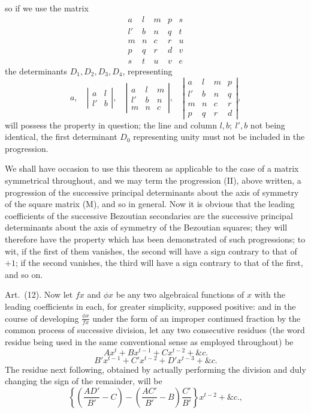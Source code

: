 \documentclass[11pt]{article}
\newcommand{\sourcepage}[1]{\marginpar{\scriptsize p.~#1}}
\newcommand{\art}[1]{\par\smallskip\noindent Art.~(#1).\quad}
\begin{document}
\sourcepage{455}
so if we use the matrix
\[
\begin{array}{ccccc}
a&l&m&p&s\\
l'&b&n&q&t\\
m&n&c&r&u\\
p&q&r&d&v\\
s&t&u&v&e
\end{array}
\]
the determinants $D_1,D_2,D_3,D_4$, representing
\[
a,\quad
\left|\begin{array}{cc}a&l\\ l'&b\end{array}\right|,\quad
\left|\begin{array}{ccc}a&l&m\\ l'&b&n\\ m&n&c\end{array}\right|,\quad
\left|\begin{array}{cccc}a&l&m&p\\ l'&b&n&q\\ m&n&c&r\\ p&q&r&d\end{array}\right|,
\]
will possess the property in question; the line and column $l,b;\ l',b$ not being identical, the first determinant $D_0$ representing unity must not be included in the progression.

We shall have occasion to use this theorem as applicable to the case of a matrix symmetrical throughout, and we may term the progression (II), above written, a progression of the successive principal determinants about the axis of symmetry of the square matrix (M), and so in general. Now it is obvious that the leading coefficients of the successive Bezoutian secondaries are the successive principal determinants about the axis of symmetry of the Bezoutian squares; they will therefore have the property which has been demonstrated of such progressions; to wit, if the first of them vanishes, the second will have a sign contrary to that of $+1$; if the second vanishes, the third will have a sign contrary to that of the first, and so on.

\art{12} Now let $fx$ and $\phi x$ be any two algebraical functions of $x$ with the leading coefficients in each, for greater simplicity, supposed positive: and in the course of developing $\frac{\phi x}{fx}$ under the form of an improper continued fraction by the common process of successive division, let any two consecutive residues (the word residue being used in the same conventional sense as employed throughout) be
\[
Ax^t+Bx^{t-1}+Cx^{t-2}+\&c.
\]
\[
B'x^{t-1}+C'x^{t-2}+D'x^{t-3}+\&c.
\]
The residue next following, obtained by actually performing the division and duly changing the sign of the remainder, will be
\[
\left\{\left(\frac{AD'}{B'}-C\right)-\left(\frac{AC'}{B'}-B\right)\frac{C'}{B'}\right\}x^{t-2}+\&c.,
\]
\end{document}
